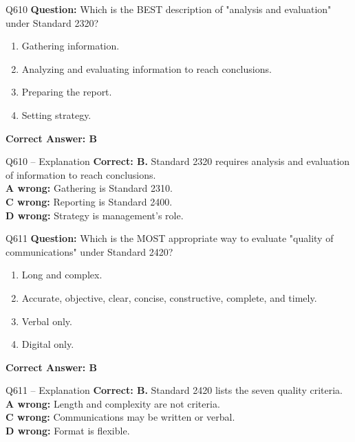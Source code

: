 \documentclass[aspectratio=169,10pt]{beamer}
\begin{document}
	\begin{frame}[t]{Q610}
		\small
		\textbf{Question:} Which is the BEST description of "analysis and evaluation" under Standard 2320?
		\begin{enumerate}[label=\Alph*.,itemsep=1pt,topsep=2pt]
			\item Gathering information.
			\item Analyzing and evaluating information to reach conclusions.
			\item Preparing the report.
			\item Setting strategy.
		\end{enumerate}
		\vspace{4pt}
		\textbf{Correct Answer: B}
	\end{frame}
	
	\begin{frame}[t]{Q610 -- Explanation}
		\small
		\textbf{Correct: B.} Standard 2320 requires analysis and evaluation of information to reach conclusions. \\[4pt]
		\textbf{A wrong:} Gathering is Standard 2310. \\[2pt]
		\textbf{C wrong:} Reporting is Standard 2400. \\[2pt]
		\textbf{D wrong:} Strategy is management's role.
	\end{frame}
	
	\begin{frame}[t]{Q611}
		\small
		\textbf{Question:} Which is the MOST appropriate way to evaluate "quality of communications" under Standard 2420?
		\begin{enumerate}[label=\Alph*.,itemsep=1pt,topsep=2pt]
			\item Long and complex.
			\item Accurate, objective, clear, concise, constructive, complete, and timely.
			\item Verbal only.
			\item Digital only.
		\end{enumerate}
		\vspace{4pt}
		\textbf{Correct Answer: B}
	\end{frame}
	
	\begin{frame}[t]{Q611 -- Explanation}
		\small
		\textbf{Correct: B.} Standard 2420 lists the seven quality criteria. \\[4pt]
		\textbf{A wrong:} Length and complexity are not criteria. \\[2pt]
		\textbf{C wrong:} Communications may be written or verbal. \\[2pt]
		\textbf{D wrong:} Format is flexible.
	\end{frame}
	
\end{document}
